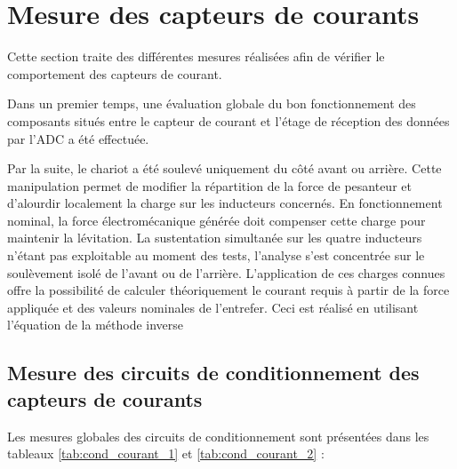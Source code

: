 \section{Mesure des capteurs de courants}
Cette section traite des différentes mesures réalisées afin de vérifier le comportement des capteurs de courant.

Dans un premier temps, une évaluation globale du bon fonctionnement des composants situés entre le capteur de courant et l'étage de réception des données par l'ADC a été effectuée.

Par la suite, le chariot a été soulevé uniquement du côté avant ou arrière. Cette manipulation permet de modifier la répartition de la force de pesanteur et d'alourdir localement la charge sur les inducteurs concernés. En fonctionnement nominal, la force électromécanique générée doit compenser cette charge pour maintenir la lévitation. La sustentation simultanée sur les quatre inducteurs n'étant pas exploitable au moment des tests, l'analyse s'est concentrée sur le soulèvement isolé de l'avant ou de l'arrière. L'application de ces charges connues offre la possibilité de calculer théoriquement le courant requis à partir de la force appliquée et des valeurs nominales de l'entrefer. Ceci est réalisé en utilisant l'équation de la méthode inverse\\

\subsection{Mesure des circuits de conditionnement des capteurs de courants}

Les mesures globales des circuits de conditionnement sont présentées dans les tableaux \ref{tab:cond_courant_1} et \ref{tab:cond_courant_2} :


